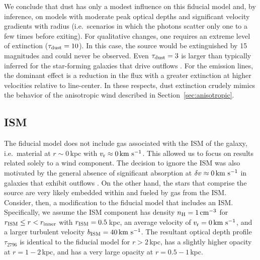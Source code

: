 \documentclass[12pt,preprint]{aastex}
\begin{document}
We conclude that dust has only a modest influence on this fiducial model and,
by inference, on models with moderate peak optical depths and
significant velocity gradients with radius (i.e.\ scenarios in which the
photons scatter only one to a few times before exiting).
For qualitative changes, one requires an extreme level of
extinction ($\tau_{\rm dust} = 10$).  In this case, the source would be
extinguished by 15\,magnitudes and could never be observed. 
Even $\tau_{\rm dust} = 3$ is larger than typically inferred for the
star-forming galaxies that drive outflows \citep[e.g.][]{cf00}.
For the emission lines,
the dominant effect is a reduction in the flux 
with a greater extinction at higher velocities relative to line-center.
In these respects, dust extinction crudely mimics the behavior of the
anisotropic
wind described in Section~\ref{sec:anisotropic}. 


\subsection{ISM}
\label{sec:ISM}

The fiducial model does not include gas associated with
the ISM %
of the galaxy, i.e.\ material at $r \sim
0$\,kpc with $v_{\rm r} \approx 0 \, {\rm km~s^{-1}}$.  This allowed us to focus on
results related solely to a wind component.  The decision to ignore the ISM
was also motivated by the general absence of significant absorption at
$\delta v \approx 0 \, {\rm km~s^{-1}}$ in galaxies that exhibit outflows 
\citep[e.g.][]{wcp+09,rwk+10,steidel+10}.
On the other hand, the stars that comprise the
source are very likely embedded within and fueled by gas
from the ISM.  
Consider, then, a modification to the fiducial model that 
includes an ISM. 
Specifically, we assume the ISM component has density $n_{\rm H} = 1 \, {\rm cm^{-3}}$ for
$r_{\rm ISM} \le r < r_{\rm inner}$ with $r_{\rm ISM} = 0.5$\,kpc, 
an average velocity of $v_{\rm r} = 0 \, {\rm km~s^{-1}}$, and a larger turbulent velocity $b_{\rm ISM} = 40 \, {\rm km~s^{-1}}$.
The resultant optical depth profile $\tau_{2796}$ is identical to the
fiducial model for $r > 2$\,kpc, has a slightly higher opacity at
$r=1-2$\,kpc, and has a very large opacity at $r = 0.5-1$\,kpc.
\end{document}
